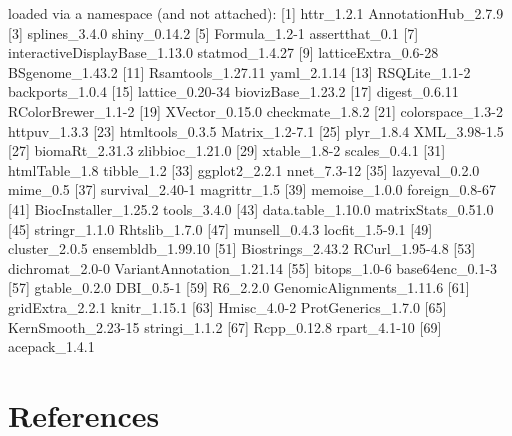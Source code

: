\documentclass[12pt]{report}
\renewenvironment{Schunk}{\vspace{0pt}}{\vspace{0pt}}
\begin{document}
\begin{Schunk}
\begin{Soutput}
loaded via a namespace (and not attached):
 [1] httr_1.2.1                    AnnotationHub_2.7.9          
 [3] splines_3.4.0                 shiny_0.14.2                 
 [5] Formula_1.2-1                 assertthat_0.1               
 [7] interactiveDisplayBase_1.13.0 statmod_1.4.27               
 [9] latticeExtra_0.6-28           BSgenome_1.43.2              
[11] Rsamtools_1.27.11             yaml_2.1.14                  
[13] RSQLite_1.1-2                 backports_1.0.4              
[15] lattice_0.20-34               biovizBase_1.23.2            
[17] digest_0.6.11                 RColorBrewer_1.1-2           
[19] XVector_0.15.0                checkmate_1.8.2              
[21] colorspace_1.3-2              httpuv_1.3.3                 
[23] htmltools_0.3.5               Matrix_1.2-7.1               
[25] plyr_1.8.4                    XML_3.98-1.5                 
[27] biomaRt_2.31.3                zlibbioc_1.21.0              
[29] xtable_1.8-2                  scales_0.4.1                 
[31] htmlTable_1.8                 tibble_1.2                   
[33] ggplot2_2.2.1                 nnet_7.3-12                  
[35] lazyeval_0.2.0                mime_0.5                     
[37] survival_2.40-1               magrittr_1.5                 
[39] memoise_1.0.0                 foreign_0.8-67               
[41] BiocInstaller_1.25.2          tools_3.4.0                  
[43] data.table_1.10.0             matrixStats_0.51.0           
[45] stringr_1.1.0                 Rhtslib_1.7.0                
[47] munsell_0.4.3                 locfit_1.5-9.1               
[49] cluster_2.0.5                 ensembldb_1.99.10            
[51] Biostrings_2.43.2             RCurl_1.95-4.8               
[53] dichromat_2.0-0               VariantAnnotation_1.21.14    
[55] bitops_1.0-6                  base64enc_0.1-3              
[57] gtable_0.2.0                  DBI_0.5-1                    
[59] R6_2.2.0                      GenomicAlignments_1.11.6     
[61] gridExtra_2.2.1               knitr_1.15.1                 
[63] Hmisc_4.0-2                   ProtGenerics_1.7.0           
[65] KernSmooth_2.23-15            stringi_1.1.2                
[67] Rcpp_0.12.8                   rpart_4.1-10                 
[69] acepack_1.4.1                
\end{Soutput}
\end{Schunk}

\section{References}



\end{document}
